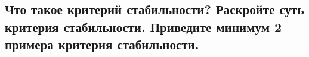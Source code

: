 

\subsection{Что такое критерий стабильности? Раскройте суть критерия стабильности. Приведите минимум 2 примера критерия стабильности.}


